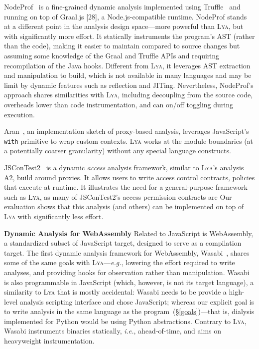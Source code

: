 \documentclass[letterpaper,twocolumn,10pt]{article}
\def\eg{{\em e.g.}, }
\def\ie{{\em i.e.}, }
\newcommand{\heading}[1]{\vspace{2pt}\noindent\textbf{#1}\enspace}
\newcommand{\ttt}[1]{\texttt{#1}}
\newcommand{\sx}[1]{(\S\ref{#1})}
\newcommand{\sys}{{\scshape Lya}\xspace}
\newcommand{\fixme}[1]{{\color{red}#1}}
\begin{document}
NodeProf~\cite{javascript3} is a fine-grained dynamic analysis implemented using Truffle~\cite{} and running on top of Graal.js [28], a Node.js-compatible runtime.
NodeProf stands at a different point in the analysis design space---more powerful than \sys, but with significantly more effort.
It statically instruments the program's AST (rather than the code), making it easier to maintain compared to source changes but assuming some knowledge of the Graal and Truffle APIs and requiring recompilation of the Java hooks.
Different from \sys, it leverages AST extraction and manipulation to build, which is not available in many languages and may be limit by dynamic features such as reflection and JITing.
Nevertheless, NodeProf's approach shares similarities with \sys, including decoupling from the source code, overheads lower than code instrumentation, and can on/off toggling during execution.

Aran~\cite{javascript1}, an implementation sketch of proxy-based analysis, leverages JavaScript's \ttt{with} primitive to wrap custom contexts.
\sys works at the module boundaries (at a potentially coarser granularity) without any special language constructs.

JSConTest2~\cite{javascript2} is a dynamic \emph{access} analysis framework, similar to \sys's analysis \fixme{A2}, build around proxies.
It allows users to write access control contracts, policies that execute at runtime.
It illustrates the need for a general-purpose framework such as \sys, as many of JSConTest2's access permission contracts are 
Our evaluation shows that this analysis (and others) can be implemented on top of \sys with significantly less effort.


\heading{Dynamic Analysis for WebAssembly}
Related to JavaScript is WebAssembly, a standardized subset of JavaScript target, designed to serve as a compilation target.
The first dynamic analysis framework for WebAssembly, Wasabi~\cite{wasabi}, shares some of the same goals with \sys---\eg lowering the effort required to write analyses, and providing hooks for observation rather than manipulation.
Wasabi is also programmable in JavaScript (which, however, is not its target language), a similarity to \sys that is mostly accidental:
  Wasabi needs to be provide a high-level analysis scripting interface and chose JavaScript;
  whereas our explicit goal is to write analysis in the same language as the program~\sx{goals}---that is, dialysis implemented for Python would be using Python abstractions.
Contrary to \sys, Wasabi instruments binaries statically, \ie ahead-of-time, and aims on heavyweight instrumentation.
\end{document}
